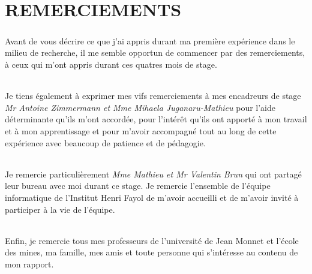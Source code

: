 \chapter{REMERCIEMENTS}
\paragraph{}
Avant de vous décrire ce que j’ai appris durant ma première expérience dans le milieu de recherche, il me semble opportun de commencer par des remerciements, à ceux qui m’ont appris durant ces quatres mois de stage. 
\subparagraph{}
Je tiens également à exprimer mes vifs remerciements à mes encadreurs de stage {\it Mr Antoine Zimmermann et Mme Mihaela Juganaru-Mathieu} pour l’aide déterminante qu’ils m’ont accordée, pour l’intérêt qu’ils ont apporté à mon travail et à mon apprentissage et pour m’avoir accompagné tout au long de cette expérience avec beaucoup de patience et de pédagogie.
\subparagraph{}
Je remercie particulièrement {\it Mme Mathieu et Mr Valentin Brun} qui ont partagé leur bureau avec moi durant ce stage. 
Je remercie l'ensemble de l'équipe informatique de l'Institut Henri Fayol de m'avoir accueilli et de m'avoir
invité à participer à la vie de l'équipe.
\subparagraph{}
Enfin, je remercie tous mes professeurs de l’université de Jean Monnet et l'école des mines, ma famille, mes amis et toute personne qui s’intéresse au contenu de mon rapport.
